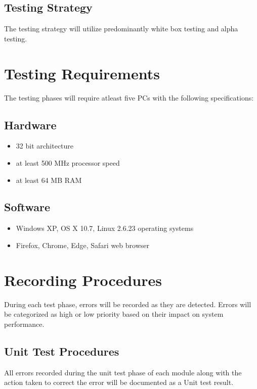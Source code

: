 \documentclass{scrreprt}
\begin{document}
	\section{Testing Strategy}
	The testing strategy will utilize predominantly white box testing and alpha testing.

	{\let\clearpage\relax \chapter{Testing Requirements}}
	The testing phases will require atleast five PCs with the following specifications:
	\section{Hardware}
	\begin{itemize}
		\item 32 bit architecture
		\item at least 500 MHz processor speed
		\item at least 64 MB RAM
	\end{itemize}

	\section{Software}
	\begin{itemize}
		\item Windows XP, OS X 10.7, Linux 2.6.23 operating systems
		\item Firefox, Chrome, Edge, Safari web browser
	\end{itemize}

	{\let\clearpage\relax \chapter{Recording Procedures}}
	During each test phase, errors will be recorded as they are detected. Errors will be categorized as high or low priority based on their impact on system performance.
	
	\section{Unit Test Procedures}
	All errors recorded during the unit test phase of each module along with the action taken to correct the error will be documented as a Unit test result.
\end{document}
